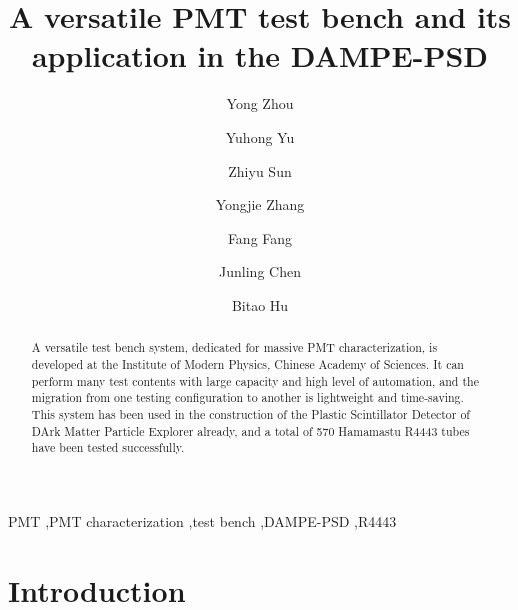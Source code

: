 \documentclass[preprint, times]{elsarticle}
\begin{document}
\begin{frontmatter}

\title{A versatile PMT test bench and its application in the DAMPE-PSD}

\author[imp,lzu,ucas]{Yong Zhou}

\author[imp]{Yuhong Yu}

\author[imp]{Zhiyu Sun}

\author[imp]{Yongjie Zhang}
\author[imp]{Fang Fang}
\author[imp]{Junling Chen}

\author[lzu]{Bitao Hu}

\address[imp]{Institute of Modern Physicas, Chinese Academy of Sciences,  509 Nanchang Road,  Lanzhou,  730000,  P.R.China}
\address[lzu]{School of Nuclear Science and Technology,  Lanzhou University,  222 South Tianshui Road,  Lanzhou,  730000,  P.R.China}
\address[ucas]{Graduate University of the Chinese Academy of Sciences,  19A Yuquan Road,  Beijing,  100049,  P.R.China}

\begin{abstract}

A versatile test bench system, dedicated for massive PMT characterization, is developed at the Institute of Modern Physics, Chinese Academy of Sciences. 
It can perform many test contents with large capacity and high level of automation, and the migration from one testing configuration to another is lightweight and time-saving. 
This system has been used in the construction of the Plastic Scintillator Detector of DArk Matter Particle Explorer already, and a total of 570 Hamamastu R4443 tubes have been tested successfully.
\end{abstract}

\begin{keyword}
PMT
\sep PMT characterization
\sep test bench
\sep DAMPE-PSD
\sep R4443


\end{keyword}

\end{frontmatter}

\linenumbers
\section{Introduction}
\label{sec:introduction}
\end{document}
